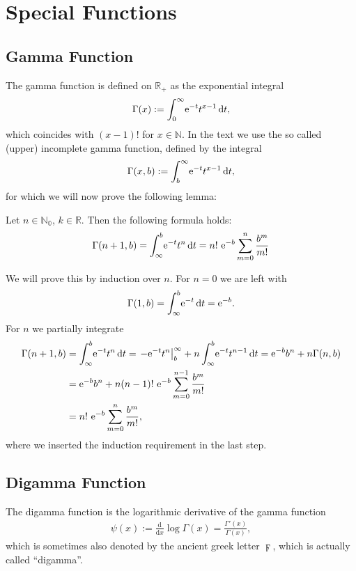 \section{Special Functions}
\subsection{Gamma Function}
\label{app:gamma}
The gamma function is defined on $\mathbb{R}_{+}$ as the exponential integral
\begin{align}
    \Gamma(x) := \Integ[\infty]{0}{t}{\Eto{-t}t^{x-1}},
    \label{def:gamma}
\end{align}
which coincides with $(x-1)!$ for $x\in\mathbb{N}$. In the text we use the so
called (upper) incomplete gamma function, defined by the integral
\begin{align}
  \Gamma(x,b) := \Integ[\infty]{b}{t}{\Eto{-t}t^{x-1}},
\end{align}
for which we will now prove the following lemma:
\begin{Lemma}
  \label{lem:incomplete-gamma}
  Let $n\in\mathbb{N_0}$, $k\in\mathbb{R}$. Then the following formula holds:
  \begin{align}
    \Gamma(n+1, b) = \Integ[b]{\infty}{t}{\Eto{-t} t^n} = n!\ \Eto{-b}\sum_{m=0}^n
    \frac{b^m}{m!}
  \end{align}
  \begin{Proof}
    We will prove this by induction over $n$. For $n = 0$ we are left with
    \begin{align*}
      \Gamma(1, b) = \Integ[b]{\infty}{t}{\Eto{-t}} = \Eto{-b}.
    \end{align*}
    For $n$ we partially integrate
    \begin{align*}
      \Gamma(n+1, b) &= \Integ[b]{\infty}{t}{\Eto{-t} t^n} 
                     = \left.-\Eto{-t} t^n \right|_{b}^{\infty} +
      n\Integ[b]{\infty}{t}{\Eto{-t}t^{n-1}}
      = \Eto{-b} b^n + n\Gamma(n, b) \\
      &= \Eto{-b} b^n + n (n-1)!\ \Eto{-b}\sum_{m=0}^{n-1} \frac{b^m}{m!} \\
      &= n!\ \Eto{-b} \sum_{m=0}^n \frac{b^m}{m!},
    \end{align*}
    where we inserted the induction requirement in the last step.
  \end{Proof}
\end{Lemma}

\subsection{Digamma Function}
The digamma function is the logarithmic derivative of the gamma function
\begin{align}
    \psi(x) := \frac{\mathrm d}{\mathrm dx}\log{\Gamma(x)}
            = \frac{\Gamma'(x)}{\Gamma(x)},
    \label{def:digamma}
\end{align}
which is sometimes also denoted by the ancient greek letter $\digamma$, which is
actually called ``digamma''.

